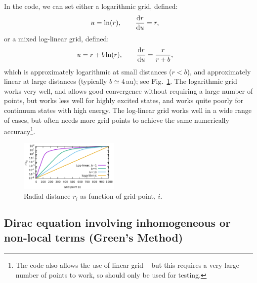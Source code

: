 \documentclass[10pt,twocolumn,a4paper]{article}%
\def\d{\ensuremath{{\rm d}}}
\begin{document}
In the code, we can set either a logarithmic grid, defined:
\begin{align}
u &= \ln(r), \qquad
\frac{\d r}{\d u} = r,
\end{align}
or a mixed log-linear grid, defined: 
\begin{align}
u &= r + b \ln(r), \qquad
\frac{\d r}{\d u} = \frac{r}{r + b},
\end{align}
which is approximately logarithmic at small distances ($r<b$), and approximately linear at large distances (typically $b\simeq4$\,au); see Fig.~\ref{Fig:grids}.
The logarithmic grid works very well, and allows good convergence without requiring a large number of points, but works less well for highly excited states, and works quite poorly for continuum states with high energy.
The log-linear grid works well in a wide range of cases, but often needs more grid points to achieve the same numerically accuracy\footnote{The code also allows the use of linear grid -- but this requires a very large number of points to work, so should only be used for testing.}.



\begin{figure}
\centering
\includegraphics[width=0.43\textwidth]{img/Grids}
\caption{\small Radial distance $r_i$ as function of grid-point, $i$.\label{Fig:grids}}
\end{figure}



\subsection{Dirac equation involving inhomogeneous or non-local terms (Green's Method)}
\end{document}
